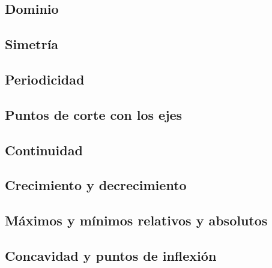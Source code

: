 
\subsection{Dominio}



\subsection{Simetría}


\subsection{Periodicidad}


\subsection{Puntos de corte con los ejes}


\subsection{Continuidad}


\subsection{Crecimiento y decrecimiento}


\subsection{Máximos y mínimos relativos y absolutos}


\subsection{Concavidad y puntos de inflexión}
